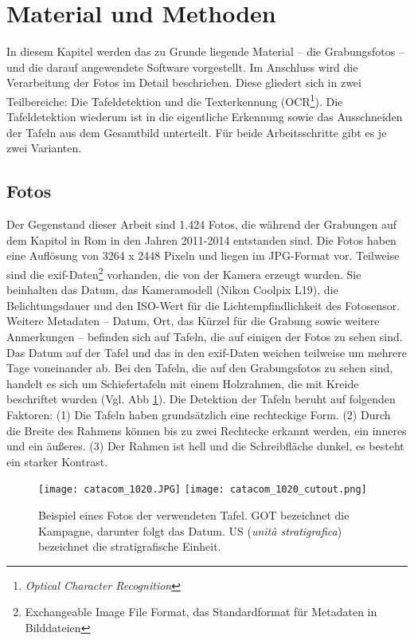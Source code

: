 \section{Material und Methoden}

In diesem Kapitel werden das zu Grunde liegende Material -- die Grabungsfotos -- und die darauf angewendete Software vorgestellt. Im Anschluss wird die Verarbeitung der Fotos im Detail beschrieben. 
Diese gliedert sich in zwei Teilbereiche: Die Tafeldetektion und die Texterkennung (OCR\footnote{\textit{Optical Character Recognition}}). Die Tafeldetektion wiederum ist in die eigentliche Erkennung sowie das Ausschneiden der Tafeln aus dem Gesamtbild unterteilt. Für beide Arbeitsschritte gibt es je zwei Varianten.
\subsection{Fotos}
Der Gegenstand dieser Arbeit sind 1.424 Fotos, die während der Grabungen auf dem Kapitol in Rom in den Jahren 2011-2014 entstanden sind. Die Fotos haben eine Auflösung von 3264 x 2448 Pixeln und liegen im JPG-Format vor. Teilweise sind die exif-Daten\footnote{Exchangeable Image File Format, das Standardformat für Metadaten in Bilddateien\cite{exif}} vorhanden, die von der Kamera erzeugt wurden. Sie beinhalten das Datum, das Kameramodell (Nikon Coolpix L19), die Belichtungsdauer und den ISO-Wert für die Lichtempfindlichkeit des Fotosensor. Weitere Metadaten -- Datum, Ort, das Kürzel für die Grabung sowie weitere Anmerkungen -- befinden sich auf Tafeln, die auf einigen der Fotos zu sehen sind. Das Datum auf der Tafel und das in den exif-Daten weichen teilweise um mehrere Tage voneinander ab.
Bei den Tafeln, die auf den Grabungsfotos zu sehen sind, handelt es sich um Schiefertafeln mit einem Holzrahmen, die mit Kreide beschriftet wurden (Vgl. Abb \ref{fig:einfachetafel}). Die Detektion der Tafeln beruht auf folgenden Faktoren: (1) Die Tafeln haben grundsätzlich eine rechteckige Form. (2) Durch die Breite des Rahmens können bis zu zwei Rechtecke erkannt werden, ein inneres und ein äußeres. (3) Der Rahmen ist hell und die Schreibfläche dunkel, es besteht ein starker Kontrast.
\begin{figure}[!h]
\texttt{[image: catacom\_1020.JPG]}
\texttt{[image: catacom\_1020\_cutout.png]}
\caption{Beispiel eines Fotos der verwendeten Tafel. GOT bezeichnet die Kampagne, darunter folgt das Datum. US (\textit{unità stratigrafica}) bezeichnet die stratigrafische Einheit.}
\label{fig:einfachetafel}
\end{figure}
